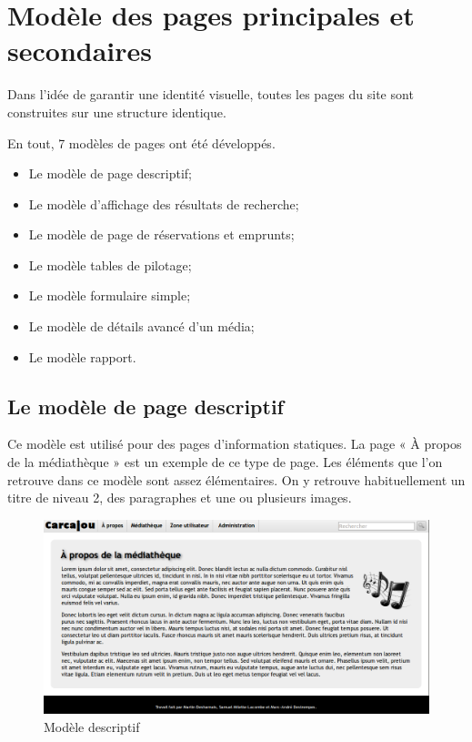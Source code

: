\documentclass[letter, 11pt]{report}
\begin{document}
\section{Modèle des pages principales et secondaires}

Dans l'idée de garantir une identité visuelle, toutes les pages du site sont construites sur une structure identique.

En tout, 7 modèles de pages ont été développés.

\begin{itemize}
	\item Le modèle de page descriptif;
	\item Le modèle d'affichage des résultats de recherche;
	\item Le modèle de page de réservations et emprunts;
	\item Le modèle tables de pilotage;
	\item Le modèle formulaire simple;
	\item Le modèle de détails avancé d'un média;
	\item Le modèle rapport.
\end{itemize}

\subsection{Le modèle de page descriptif}

Ce modèle est utilisé pour des pages d'information statiques. La page « À propos de la médiathèque » est un exemple de ce type de page. Les éléments que l'on retrouve dans ce modèle sont assez élémentaires. On y retrouve habituellement un titre de niveau 2, des paragraphes et une ou plusieurs images.

\begin{figure}[htbp]
	\begin{center}
		\includegraphics[scale=0.4]{captures_ecran/modele_descriptif.png}
	\end{center}
	\caption{Modèle descriptif}
\end{figure}
\end{document}
